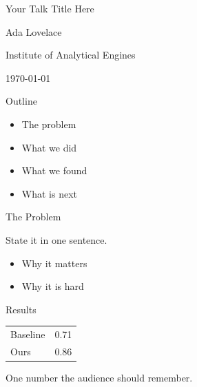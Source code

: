 \documentclass[landscape]{slides}
\begin{document}
\begin{slide}
\begin{center}
{\Large Your Talk Title Here}

\vspace{2em}
Ada Lovelace

\vspace{1em}
Institute of Analytical Engines

\vspace{1em}
\today
\end{center}
\end{slide}

\begin{slide}
\begin{center}\Large Outline\end{center}

\begin{itemize}
\item The problem
\item What we did
\item What we found
\item What is next
\end{itemize}
\end{slide}

\begin{slide}
\begin{center}\Large The Problem\end{center}

State it in one sentence.

\begin{itemize}
\item Why it matters
\item Why it is hard
\end{itemize}
\end{slide}

\begin{slide}
\begin{center}\Large Results\end{center}

\begin{center}
\begin{tabular}{lr}
Baseline & 0.71\\
Ours     & 0.86\\
\end{tabular}
\end{center}

One number the audience should remember.
\end{slide}
\end{document}
